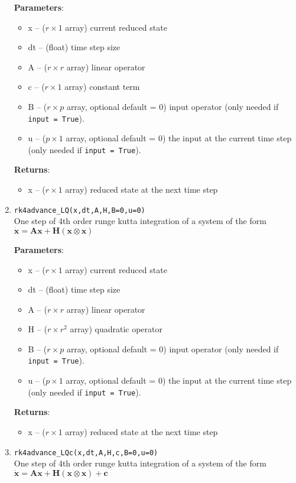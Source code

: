 \documentclass[11pt]{article} %
\newcommand{\code}[1]{\colorbox{light-gray}{\texttt{#1}}}
\newcommand{\bx}{\mathbf{x}}
\newcommand{\bA}{\mathbf{A}}
\newcommand{\bc}{\mathbf{c}}
\newcommand{\bH}{\mathbf{H}}
\begin{document}
\begin{enumerate}
\textbf{Parameters}:
	\begin{itemize}
	\item[] x -- ($r\times 1$ array) current reduced state 
	\item[] dt -- (float) time step size
	\item[] A -- ($r \times r$ array) linear operator
	\item[] c -- ($r \times 1$ array) constant term
	\item[] B -- ($r \times p$ array, optional default = 0) input operator (only needed if \code{input = True}).
	\item[] u -- ($p \times 1$ array, optional default = 0) the input at the current time step (only needed if \code{input = True}).
	\end{itemize}
\textbf{Returns}:
\begin{itemize}
\item[] x -- ($r \times 1$ array) reduced state at the next time step
\end{itemize}


\item{\code{rk4advance\_LQ(x,dt,A,H,B=0,u=0)}}\\
One step of 4th order runge kutta integration of a system of the form $\dot{\bx} = \bA\bx + \bH (\bx \otimes \bx)$

\textbf{Parameters}:
	\begin{itemize}
	\item[] x -- ($r\times 1$ array) current reduced state 
	\item[] dt -- (float) time step size
	\item[] A -- ($r \times r$ array) linear operator
	\item[] H -- ($r \times r^2$ array) quadratic operator
	\item[] B -- ($r \times p$ array, optional default = 0) input operator (only needed if \code{input = True}).
	\item[] u -- ($p \times 1$ array, optional default = 0) the input at the current time step (only needed if \code{input = True}).
	\end{itemize}
\textbf{Returns}:
\begin{itemize}
\item[] x -- ($r \times 1$ array) reduced state at the next time step
\end{itemize}

\item{\code{rk4advance\_LQc(x,dt,A,H,c,B=0,u=0)}}\\
One step of 4th order runge kutta integration of a system of the form $\dot{\bx} = \bA\bx + \bH (\bx \otimes \bx) + \bc$


\end{enumerate}
\end{document}
